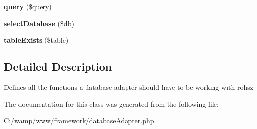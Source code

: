 \begin{DoxyCompactItemize}
\item 
\hypertarget{interfacedatabase_adapter_ac9fddec3f6bd1db128887a1b211d90f0}{
{\bfseries query} (\$query)}
\label{interfacedatabase_adapter_ac9fddec3f6bd1db128887a1b211d90f0}

\item 
\hypertarget{interfacedatabase_adapter_ab624b0b234f9db9dbc6dc4180f566b1f}{
{\bfseries selectDatabase} (\$db)}
\label{interfacedatabase_adapter_ab624b0b234f9db9dbc6dc4180f566b1f}

\item 
\hypertarget{interfacedatabase_adapter_ae7cdaa744d52a1eb0103e377023ca528}{
{\bfseries tableExists} (\$\hyperlink{classtable}{table})}
\label{interfacedatabase_adapter_ae7cdaa744d52a1eb0103e377023ca528}

\end{DoxyCompactItemize}


\subsection{Detailed Description}
Defines all the functions a database adapter should have to be working with rolisz 

The documentation for this class was generated from the following file:\begin{DoxyCompactItemize}
\item 
C:/wamp/www/framework/databaseAdapter.php\end{DoxyCompactItemize}
